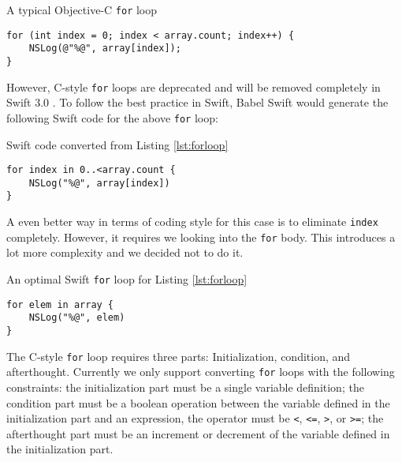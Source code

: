 \documentclass{sfuthesis}
\begin{document}
\begin{listing}[H]
\caption{A typical Objective-C \texttt{for} loop}
\label{lst:forloop}
\begin{verbatim}
for (int index = 0; index < array.count; index++) {
    NSLog(@"%@", array[index]);
}
\end{verbatim}
\end{listing}

However, C-style \texttt{for} loops are deprecated and will be removed completely in Swift 3.0 \cite{removecforloops}. To follow the best practice in Swift, Babel Swift would generate the following Swift code for the above \texttt{for} loop:

\begin{listing}[H]
\caption{Swift code converted from Listing \ref{lst:forloop}}
\begin{verbatim}
for index in 0..<array.count {
    NSLog("%@", array[index])
}
\end{verbatim}
\end{listing}

A even better way in terms of coding style for this case is to eliminate \texttt{index} completely. However, it requires we looking into the \texttt{for} body. This introduces a lot more complexity and we decided not to do it.

\begin{listing}[H]
\caption{An optimal Swift \texttt{for} loop for Listing \ref{lst:forloop}}
\begin{verbatim}
for elem in array {
    NSLog("%@", elem)
}
\end{verbatim}
\end{listing}

The C-style \texttt{for} loop requires three parts: Initialization, condition, and afterthought. Currently we only support converting \texttt{for} loops with the following constraints: the initialization part must be a single variable definition; the condition part must be a boolean operation between the variable defined in the initialization part and an expression, the operator must be \texttt{<}, \texttt{<=}, \texttt{>}, or \texttt{>=}; the afterthought part must be an increment or decrement of the variable defined in the initialization part.


%
%
%
\end{document}
